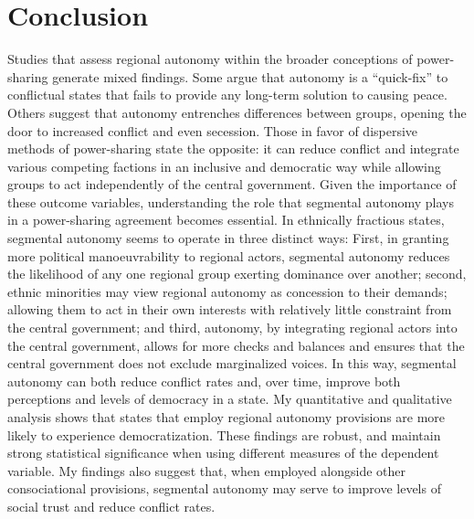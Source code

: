 \documentclass[12pt]{article}
\begin{document}
\section{Conclusion}
Studies that assess regional autonomy within the broader conceptions of power-sharing generate mixed findings. Some argue that autonomy is a ``quick-fix'' to conflictual states that fails to provide any long-term solution to causing peace. Others suggest that autonomy entrenches differences between groups, opening the door to increased conflict and even secession. Those in favor of dispersive methods of power-sharing state the opposite: it can reduce conflict and integrate various competing factions in an inclusive and democratic way while allowing groups to act independently of the central government. Given the importance of these outcome variables, understanding the role that segmental autonomy plays in a power-sharing agreement becomes essential. In ethnically fractious states, segmental autonomy seems to operate in three distinct ways: First, in granting more political manoeuvrability to regional actors, segmental autonomy reduces the likelihood of any one regional group exerting dominance over another; second, ethnic minorities may view regional autonomy as concession to their demands; allowing them to act in their own interests with relatively little constraint from the central government; and third, autonomy, by integrating regional actors into the central government, allows for more checks and balances and ensures that the central government does not exclude marginalized voices. In this way, segmental autonomy can both reduce conflict rates and, over time, improve both perceptions and levels of democracy in a state. My quantitative and qualitative analysis shows that states that employ regional autonomy provisions are more likely to experience democratization. These findings are robust, and maintain strong statistical significance when using different measures of the dependent variable. My findings also suggest that, when employed alongside other consociational provisions, segmental autonomy may serve to improve levels of social trust and reduce conflict rates.
\end{document}
